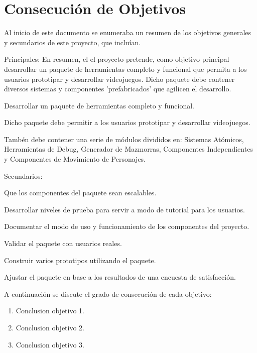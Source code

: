 \section{Consecución de Objetivos}

Al inicio de este documento se enumeraba un resumen de los objetivos generales y secundarios de este proyecto, que incluían.

Principales:
En resumen, el el proyecto pretende, como objetivo principal desarrollar un paquete de herramientas completo y funcional que permita a los usuarios prototipar y 
 desarrollar videojuegos. Dicho paquete debe contener diversos sistemas y componentes 'prefabricados' que agilicen el desarrollo. 

\begin{compactitem}
    \item Desarrollar un paquete de herramientas completo y funcional.
    \item Dicho paquete debe permitir a los usuarios prototipar y desarrollar videojuegos.
    \item Tambén debe contener una serie de módulos divididos en: Sistemas Atómicos, Herramientas de Debug, Generador de Mazmorras, Componentes Independientes y Componentes de Movimiento de Personajes.
\end{compactitem}

Secundarios:
\begin{compactitem}
  \item Que los componentes del paquete sean escalables.
  \item Desarrollar niveles de prueba para servir a modo de tutorial para los usuarios.
  \item Documentar el modo de uso y funcionamiento de los componentes del proyecto.
  \item Validar el paquete con usuarios reales.
  \item Construir varios prototipos utilizando el paquete.
  \item Ajustar el paquete en base a los resultados de una encuesta de satisfacción.
\end{compactitem}

A continuación se discute el grado de consecución de cada objetivo:
\begin{enumerate}[itemsep=0mm]

\item Conclusion objetivo 1.
  
\item Conclusion objetivo 2.

\item Conclusion objetivo 3.

\end{enumerate}

